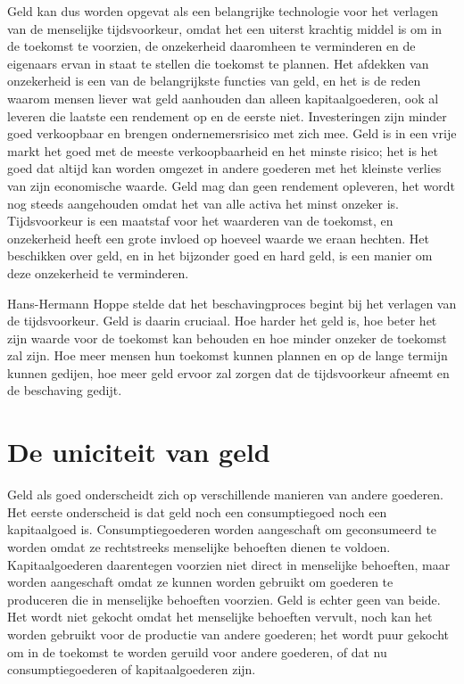 Geld kan dus worden opgevat als een belangrijke technologie voor het verlagen van de menselijke tijdsvoorkeur, omdat het een uiterst krachtig middel is om in de toekomst te voorzien, de onzekerheid daaromheen te verminderen en de eigenaars ervan in staat te stellen die toekomst te plannen. Het afdekken van onzekerheid is een van de belangrijkste functies van geld, en het is de reden waarom mensen liever wat geld aanhouden dan alleen kapitaalgoederen, ook al leveren die laatste een rendement op en de eerste niet.\autocite{117} Investeringen zijn minder goed verkoopbaar en brengen ondernemersrisico met zich mee. Geld is in een vrije markt het goed met de meeste verkoopbaarheid en het minste risico; het is het goed dat altijd kan worden omgezet in andere goederen met het kleinste verlies van zijn economische waarde. Geld mag dan geen rendement opleveren, het wordt nog steeds aangehouden omdat het van alle activa het minst onzeker is.\autocite{118} Tijdsvoorkeur is een maatstaf voor het waarderen van de toekomst, en onzekerheid heeft een grote invloed op hoeveel waarde we eraan hechten. Het beschikken over geld, en in het bijzonder goed en hard geld, is een manier om deze onzekerheid te verminderen.

\clearpage
Hans-Hermann Hoppe stelde dat het beschavingproces begint bij het verlagen van de tijdsvoorkeur.\autocite{119} Geld is daarin cruciaal. Hoe harder het geld is, hoe beter het zijn waarde voor de toekomst kan behouden en hoe minder onzeker de toekomst zal zijn. Hoe meer mensen hun toekomst kunnen plannen en op de lange termijn kunnen gedijen, hoe meer geld ervoor zal zorgen dat de tijdsvoorkeur afneemt en de beschaving gedijt.
\hypertarget{de-uniekheid-van-geld}{%
\section{De uniciteit van geld}\label{de-uniekheid-van-geld}}

Geld als goed onderscheidt zich op verschillende manieren van andere goederen. Het eerste onderscheid is dat geld noch een consumptiegoed noch een kapitaalgoed is. Consumptiegoederen worden aangeschaft om geconsumeerd te worden omdat ze rechtstreeks menselijke behoeften dienen te voldoen. Kapitaalgoederen daarentegen voorzien niet direct in menselijke behoeften, maar worden aangeschaft omdat ze kunnen worden gebruikt om goederen te produceren die in menselijke behoeften voorzien. Geld is echter geen van beide. Het wordt niet gekocht omdat het menselijke behoeften vervult, noch kan het worden gebruikt voor de productie van andere goederen; het wordt puur gekocht om in de toekomst te worden geruild voor andere goederen, of dat nu consumptiegoederen of kapitaalgoederen zijn.


